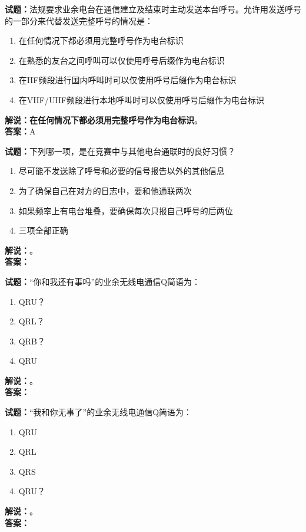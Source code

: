 \documentclass{ctexbook}
\begin{document}
\bigskip

\noindent\textbf{试题：}法规要求业余电台在通信建立及结束时主动发送本台呼号。允许用发送呼号的一部分来代替发送完整呼号的情况是：
\begin{enumerate}[leftmargin=3em]
  \item 在任何情况下都必须用完整呼号作为电台标识
  \item 在熟悉的友台之间呼叫可以仅使用呼号后缀作为电台标识
  \item 在HF频段进行国内呼叫时可以仅使用呼号后缀作为电台标识
  \item 在VHF/UHF频段进行本地呼叫时可以仅使用呼号后缀作为电台标识
\end{enumerate}
\noindent\textbf{解说：}\textbf{在任何情况下都必须用完整呼号作为电台标识}。\\\noindent\textbf{答案：}A

\bigskip

\noindent\textbf{试题：}下列哪一项，是在竞赛中与其他电台通联时的良好习惯？
\begin{enumerate}[leftmargin=3em]
  \item 尽可能不发送除了呼号和必要的信号报告以外的其他信息
  \item 为了确保自己在对方的日志中，要和他通联两次
  \item 如果频率上有电台堆叠，要确保每次只报自己呼号的后两位
  \item 三项全部正确
\end{enumerate}
\noindent\textbf{解说：}\textbf{}。\\\noindent\textbf{答案：}

\bigskip

\noindent\textbf{试题：}“你和我还有事吗”的业余无线电通信Q简语为：
\begin{enumerate}[leftmargin=3em]
  \item QRU？
  \item QRL？
  \item QRB？
  \item QRU
\end{enumerate}
\noindent\textbf{解说：}\textbf{}。\\\noindent\textbf{答案：}

\bigskip

\noindent\textbf{试题：}“我和你无事了”的业余无线电通信Q简语为：
\begin{enumerate}[leftmargin=3em]
  \item QRU
  \item QRL
  \item QRS
  \item QRU？
\end{enumerate}
\noindent\textbf{解说：}\textbf{}。\\\noindent\textbf{答案：}
\end{document}
